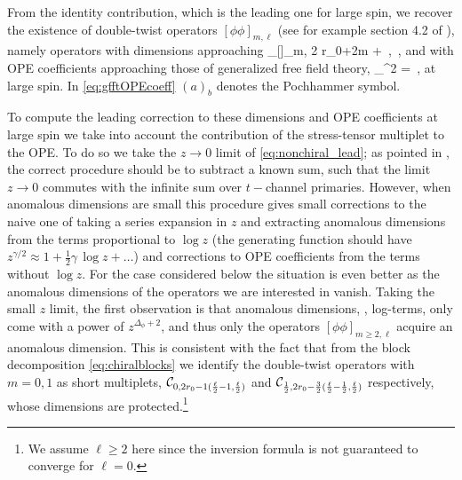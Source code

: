 From the identity contribution, which is the leading one for large spin, we recover the existence of double-twist operators $[\phi\phi]_{m,\ell}$ (see for example section 4.2 of \cite{Caron-Huot:2017vep}), namely operators with dimensions approaching
%
\be 
\Delta_{[\phi\phi]_{m,\ell}}  2 r_0+2m + \ell\,, \qquad \ell \; \,,
\ee
%
and with OPE coefficients approaching those of generalized free field theory,
%
\be 
\lambda_{}^2 = \,,
 \label{eq:gfftOPEcoeff}
\ee
%
at large spin. In \eqref{eq:gfftOPEcoeff} $(a)_b$ denotes the Pochhammer symbol.

To compute the leading correction to these dimensions and OPE coefficients at large spin we take into account the contribution of the stress-tensor multiplet to the OPE. 
To do so we take the $z \to 0 $ limit of \eqref{eq:nonchiral_lead}; as pointed in \cite{Caron-Huot:2017vep}, the correct procedure should be to subtract a known sum, such that the limit $z \to 0 $ commutes with the infinite sum over $t-$channel primaries.
However, when anomalous dimensions are small this procedure gives small corrections to the naive one of taking a series expansion in $z$ and extracting anomalous dimensions from the terms proportional to $\log z$  (the generating function should have $z^{\gamma/2} \approx 1+ \tfrac{1}{2} \gamma \, \log z + \ldots $) and corrections to OPE coefficients from the terms without $\log z$. For the case considered below the situation is even better as the anomalous dimensions of the operators we are interested in vanish.
%
Taking the small $z$ limit, the first observation is that anomalous dimensions, \ie, log-terms, only come with a power of $z^{\Delta_\phi+2}$, and thus only the operators $[\phi\phi]_{m \geqslant 2,\ell}$ acquire an anomalous dimension. This is consistent with the fact that from the block decomposition \eqref{eq:chiralblocks} we identify the double-twist operators with $m=0,1$ as short multiplets, ${\mathcal{C}}_{0, 2r_0- 1 (\frac{\ell}2-1,\frac{\ell}2) } $ and ${\mathcal{C}}_{\frac12, 2r_0- \frac32 (\frac{\ell}2-\frac12,\frac{\ell}2)}$ respectively, whose dimensions are protected.\footnote{We assume $\ell\geqslant 2$ here since the inversion formula is not guaranteed to converge for $\ell=0$.}

